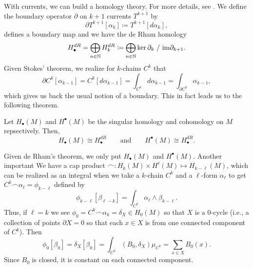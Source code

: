 \documentclass[conf]{new-aiaa}
\begin{document}
With currents, we can build a homology theory. For more details, see \cite{iversen_cauchy_1989}. We define the boundary operator $\partial$ on $k+1$ currents $T^{k+1}$ by
\begin{equation}
\partial T^{k+1}[\alpha_k] \coloneqq T^{k+1}[d\alpha_k],
\end{equation}
defines a boundary map and we have the de Rham homology
\begin{equation}
H_\bullet^{dR} = \bigoplus_{n\in \mathbb{N}} H_k^{dR} \coloneqq \bigoplus_{n\in \mathbb{N}} \ker \partial_k ~/~ \mathrm{im} \partial_{k+1}. 
\end{equation}
Given Stokes' theorem, we realize for $k$-chains $C^k$ that
\begin{equation}
\partial C^k[\alpha_{k-1}] = C^k[d\alpha_{k-1}] = \int_{C^k} d\alpha_{k-1} = \int_{\partial C^k} \alpha_{k-1},
\end{equation}
which gives us back the usual notion of a boundary. This in fact leads us to the following theorem.

\begin{theorem}
    Let $H_\bullet(M)$ and $H^\bullet(M)$ be the singular homology and cohomology on $M$ repsectively. Then,
\begin{equation}
    H_\bullet(M)\cong H_\bullet^{dR} \qquad \textrm{and} \qquad H^\bullet(M) \cong H_\bullet^{dR}.
\end{equation}
\end{theorem}
Given de Rham's theorem, we only put $H_\bullet(M)$ and $H^\bullet(M)$. Another important 
We have a cap product $\frown \colon H_k(M)\times H^\ell(M) \mapsto H_{k-\ell}(M)$, which can be realized as an integral when we take a $k$-chain $C^k$ and a $\ell$-form $\alpha_\ell$ to get $C^k \frown  \alpha_\ell = \phi_{k-\ell}$ defined by
\begin{equation}
\phi_{k-\ell}[\beta_{\ell - k}] = \int_{C^k} \alpha_\ell \wedge \beta_{k-\ell}.
\end{equation}
Thus, if $\ell = k$ we see $\phi_0 = C^k \frown \alpha_k = \delta_{X} \in H_0(M)$ so that $X$ is a $0$-cycle (i.e., a collection of points $\partial X = 0$ so that each $x\in X$ is from one connected component of $C^k$). Then
\begin{equation}
\phi_0[\beta_0] = \delta_{X}[\beta_0] = \int_{C^k} (B_0 , \delta_X ) \mu_{C^k} = \sum_{x\in X} B_0(x).
\end{equation}
Since $B_0$ is closed, it is constant on each connected component.
\end{document}
